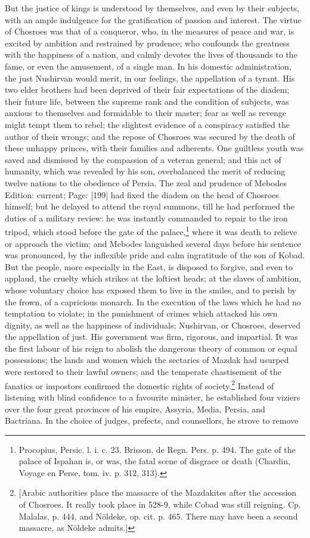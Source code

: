 But the justice of kings is understood by themselves, and even by their subjects, with an ample indulgence for the gratification of passion and interest. The virtue of Chosroes was that of a conqueror, who, in the measures of peace and war, is excited by ambition and restrained by prudence; who confounds the greatness with the happiness of a nation, and calmly devotes the lives of thousands to the fame, or even the amusement, of a single man. In his domestic administration, the just Nushirvan would merit, in our feelings, the appellation of a tyrant. His two elder brothers had been deprived of their fair expectations of the diadem; their future life, between the supreme rank and the condition of subjects, was anxious to themselves and formidable to their master; fear as well as revenge might tempt them to rebel; the slightest evidence of a conspiracy satisfied the author of their wrongs; and the repose of Chosroes was secured by the death of these unhappy princes, with their families and adherents. One guiltless youth was saved and dismissed by the compassion of a veteran general; and this act of humanity, which was revealed by his son, overbalanced the merit of reducing twelve nations to the obedience of Persia. The zeal and prudence of Mebodes Edition: current; Page: [199] had fixed the diadem on the head of Chosroes himself; but he delayed to attend the royal summons, till he had performed the duties of a military review: he was instantly commanded to repair to the iron tripod, which stood before the gate of the palace,\footnote{Procopius, Persic. l. i. c. 23. Brisson, de Regn. Pers. p. 494. The gate of the palace of Ispahan is, or was, the fatal scene of disgrace or death (Chardin, Voyage en Perse, tom. iv. p. 312, 313).} where it was death to relieve or approach the victim; and Mebodes languished several days before his sentence was pronounced, by the inflexible pride and calm ingratitude of the son of Kobad. But the people, more especially in the East, is disposed to forgive, and even to applaud, the cruelty which strikes at the loftiest heads; at the slaves of ambition, whose voluntary choice has exposed them to live in the smiles, and to perish by the frown, of a capricious monarch. In the execution of the laws which he had no temptation to violate; in the punishment of crimes which attacked his own dignity, as well as the happiness of individuals; Nushirvan, or Chosroes, deserved the appellation of just. His government was firm, rigorous, and impartial. It was the first labour of his reign to abolish the dangerous theory of common or equal possessions; the lands and women which the sectaries of Mazdak had usurped were restored to their lawful owners; and the temperate chastisement of the fanatics or impostors confirmed the domestic rights of society.\footnote{[Arabic authorities place the massacre of the Mazdakites after the accession of Chosroes. It really took place in 528-9, while Cobad was still reigning. Cp. Malalas, p. 444, and Nöldeke, op. cit. p. 465. There may have been a second massacre, as Nöldeke admits.]} Instead of listening with blind confidence to a favourite minister, he established four viziers over the four great provinces of his empire, Assyria, Media, Persia, and Bactriana. In the choice of judges, prefects, and counsellors, he strove to remove 